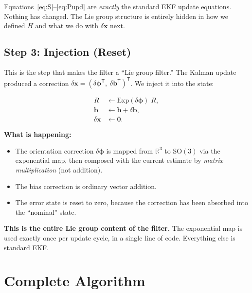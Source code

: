 \documentclass[11pt,letterpaper]{article}
\newcommand{\R}{\mathbb{R}}
\newcommand{\SO}{\mathrm{SO}(3)}
\newcommand{\expmap}{\mathrm{Exp}}
\begin{document}
Equations~\eqref{eq:S}--\eqref{eq:Pupd} are \emph{exactly} the
standard EKF update equations.  Nothing has changed.  The Lie group
structure is entirely hidden in how we defined $H$ and what we do
with $\delta\mathbf{x}$ next.

\subsection{Step 3: Injection (Reset)}

This is the step that makes the filter a ``Lie group filter.''  The
Kalman update produced a correction
$\delta\mathbf{x} = (\delta\bm{\phi}^{\mathsf{T}},\;
\delta\mathbf{b}^{\mathsf{T}})^{\mathsf{T}}$.  We inject it into
the state:

\[
  \boxed{
  \begin{aligned}
    R &\leftarrow \expmap(\delta\bm{\phi})\; R, \\
    \mathbf{b} &\leftarrow \mathbf{b} + \delta\mathbf{b}, \\
    \delta\mathbf{x} &\leftarrow \mathbf{0}.
  \end{aligned}
  }
\]

\textbf{What is happening:}
\begin{itemize}[nosep]
  \item The orientation correction $\delta\bm{\phi}$ is mapped from
    $\R^{3}$ to $\SO$ via the exponential map, then composed with
    the current estimate by \emph{matrix multiplication} (not
    addition).
  \item The bias correction is ordinary vector addition.
  \item The error state is reset to zero, because the correction has
    been absorbed into the ``nominal'' state.
\end{itemize}

\textbf{This is the entire Lie group content of the filter.}  The
exponential map is used exactly once per update cycle, in a single
line of code.  Everything else is standard EKF.

\newpage
\section{Complete Algorithm}
\end{document}
